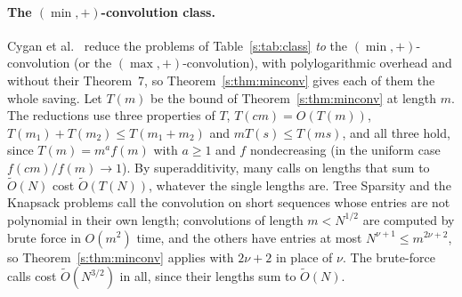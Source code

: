 \documentclass[11pt]{article}
\theoremstyle{definition}
\theoremstyle{remark}
\begin{document}
\paragraph{The $(\min,+)$-convolution class.} Cygan et al.~\cite{CMWW19} reduce the problems of Table~\ref{s:tab:class} \emph{to} the $(\min,+)$-convolution (or the $(\max,+)$-convolution), with polylogarithmic overhead and without their Theorem~7, so Theorem~\ref{s:thm:minconv} gives each of them the whole saving. Let $T(m)$ be the bound of Theorem~\ref{s:thm:minconv} at length $m$. The reductions use three properties of $T$, $T(cm)=O(T(m))$, $T(m_1)+T(m_2)\le T(m_1+m_2)$ and $mT(s)\le T(ms)$, and all three hold, since $T(m)=m^{a}f(m)$ with $a\ge1$ and $f$ nondecreasing (in the uniform case $f(cm)/f(m)\to1$). By superadditivity, many calls on lengths that sum to $\tilde O(N)$ cost $\tilde O(T(N))$, whatever the single lengths are. Tree Sparsity and the Knapsack problems call the convolution on short sequences whose entries are not polynomial in their own length; convolutions of length $m<N^{1/2}$ are computed by brute force in $O(m^2)$ time, and the others have entries at most $N^{\nu+1}\le m^{2\nu+2}$, so Theorem~\ref{s:thm:minconv} applies with $2\nu+2$ in place of $\nu$. The brute-force calls cost $\tilde O(N^{3/2})$ in all, since their lengths sum to $\tilde O(N)$.
\end{document}
